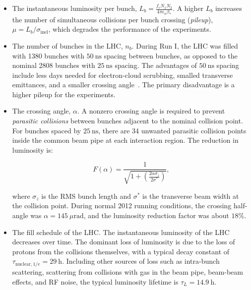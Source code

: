 \begin{itemize}
	\item The instantaneous luminosity per bunch, $L_b=\frac{f_r N_1 N_2}{4\pi\epsilon_n \beta_{*}}$. A higher $L_b$ increases the number of simultaneous collisions per bunch crossing (\emph{pileup}), $\mu=L_b/\sigma_{\mathrm{inel}}$, which degrades the performance of the experiments. 

	\item The number of bunches in the LHC, $n_b$. During Run I, the LHC was filled with 1380 bunches with $50~\mbox{ns}$ spacing between bunches, as opposed to the nominal 2808 bunches with $25~\mbox{ns}$ spacing. The advantages of $50~\mbox{ns}$ spacing include less days needed for electron-cloud scrubbing, smalled transverse emittances, and a smaller crossing angle~\cite{Papotti:2014vb}. The primary disadvantage is a higher pileup for the experiments. 

	\item The crossing angle, $\alpha$. A nonzero crossing angle is required to prevent \emph{parasitic collisions} between bunches adjacent to the nominal collision point. For bunches spaced by $25~\mbox{ns}$, there are 34 unwanted parasitic collision points inside the common beam pipe at each interaction region. The reduction in luminosity is:

	\begin{equation}
		F(\alpha)=\frac{1}{\sqrt{1+\left(\frac{2\alpha \sigma_z}{2\sigma^*}\right)}},
	\end{equation}
	
	where $\sigma_z$ is the RMS bunch length and $\sigma^{*}$ is the transverse beam width at the collision point. During normal 2012 running conditions, the crossing half-angle was $\alpha=145~\mu\mbox{rad}$, and the luminosity reduction factor was about $18\%$. 

	\item The fill schedule of the LHC. The instantaneous luminosity of the LHC decreases over time. The dominant loss of luminosity is due to the loss of protons from the collisions themselves, with a typical decay constant of $\tau_{\mathrm{nuclear},1/e}=29~\mbox{h}$. Including other sources of loss such as intra-bunch scattering, scattering from collisions with gas in the beam pipe, beam-beam effects, and RF noise, the typical luminosity lifetime is $\tau_L=14.9~\mbox{h}$. 


\end{itemize}
